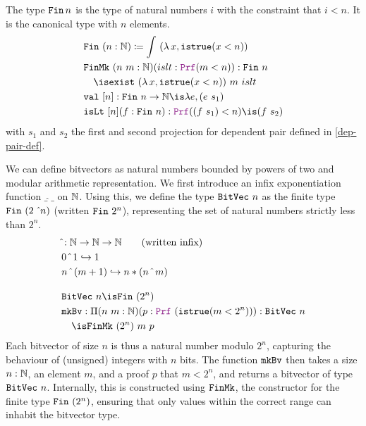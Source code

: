\begin{definition}[Fin]\label{def:fin-def}
The type $\texttt{\upshape{Fin}}\,n$ is the type of natural numbers $i$ with the constraint that $i < n$.
It is the canonical type with $n$ elements.
\begin{align*}
& \kw{Fin}~(n: \N) \coloneq \int~(\lambda\,x, \kw{istrue}(x < n)) \\
& \kw{FinMk}~(n~m: \N) (islt: \prf (m < n)) : \kw{Fin}~n \\
&\quad\is \kw{exist}~(\lambda\,x, \kw{istrue}(x <n))~m~islt\\
&\kw{val}~[n]: \kw{Fin}~n \ra \N \is \lambda e, (e~s_1) \\
&\kw{isLt}~[n] (f: \kw{Fin}~n): \prf ((f~s_1) < n) \is (f~s_2)\\
\end{align*}
with $s_1$ and $s_2$ the first and second projection for dependent pair defined in \cref{dep-pair-def}.
\end{definition}

\begin{definition}[Bitvector]\label{def:bv-def}
We can define bitvectors as natural numbers bounded by powers of two and modular arithmetic representation.
We first introduce an infix exponentiation function $\_\,\hat{}\,\_$ on $\mathbb{N}$.
Using this, we define the type $\texttt{\upshape{BitVec}}~n$ as the finite type $\texttt{\upshape{Fin}}~(2~\hat~n)$ (written $\texttt{\upshape{Fin}}~2^n$), representing the set of natural numbers strictly less than $2^n$.
\begin{align*}
& \hat{}: \N \ra \N \ra \N \qquad \text{(written inﬁx)}\\
& 0 ~\hat{}~ 1 \re 1\\
& n ~\hat{}~ (m + 1) \re n * (n ~\hat{}~ m)\\[1em]
&\kw{BitVec}~n \is \kw{Fin}~(2^n) \\
& \kw{mkBv}: \Pi(n~m: \N)(p: \prf~(\kw{istrue}(m < 2^n))): \kw{BitVec}~n\\
&\quad\is \kw{FinMk}~(2^n)~m~p
\end{align*}
Each bitvector of size $n$ is thus a natural number modulo $2^n$, capturing the behaviour of (unsigned) integers with $n$ bits.
The function $\texttt{\upshape{mkBv}}$ then takes a size $n: \mathbb{N}$, an element $m$, and a proof $p$ that $m < 2^n$, and returns a bitvector of type $\texttt{\upshape{BitVec}}~n$.
Internally, this is constructed using $\texttt{\upshape{FinMk}}$, the constructor for the finite type $\texttt{\upshape{Fin}}~(2^n)$, ensuring that only values within the correct range can inhabit the bitvector type.
\end{definition}


